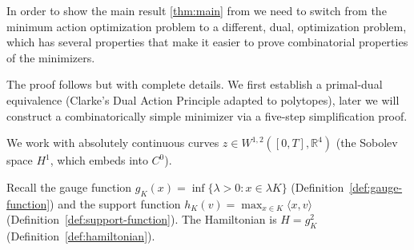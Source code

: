 %
%

In order to show the main result \ref{thm:main} from \cite{HK2017} we need to
switch from the minimum action optimization problem to a different, dual, optimization problem,
which has several properties that make it easier to prove combinatorial properties of the minimizers.

The proof follows \cite{HK2017} but with complete details. We first
establish a primal-dual equivalence (Clarke's Dual Action Principle
adapted to polytopes), later we will construct a combinatorically simple minimizer via a
five-step simplification proof.




We work with absolutely continuous curves
$z \in W^{1,2}([0, T], \mathbb{R}^4)$
(the Sobolev space $H^1$, which embeds into $C^0$).

Recall the gauge function $g_K(x) = \inf\{\lambda > 0 : x \in \lambda K\}$
(Definition~\ref{def:gauge-function}) and the support function
$h_K(v) = \max_{x \in K} \langle x, v \rangle$
(Definition~\ref{def:support-function}).
The Hamiltonian is $H = g_K^2$ (Definition~\ref{def:hamiltonian}).

